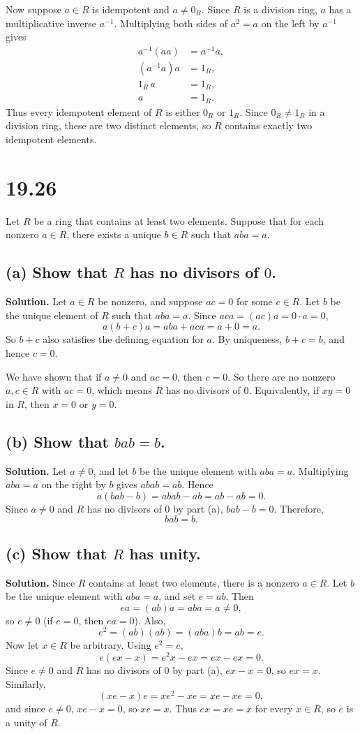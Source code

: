\documentclass[11pt]{article}
\begin{document}
Now suppose \(a\in R\) is idempotent and \(a\neq0_R\). Since \(R\) is a
division ring, \(a\) has a multiplicative inverse \(a^{-1}\).
Multiplying both sides of \(a^2=a\) on the left by \(a^{-1}\) gives
\[
\begin{aligned}
a^{-1}(aa)&=a^{-1}a,\\
(a^{-1}a)a&=1_R,\\
1_R\,a&=1_R,\\
a&=1_R.
\end{aligned}
\]
Thus every idempotent element of \(R\) is either \(0_R\) or \(1_R\).
Since \(0_R\neq1_R\) in a division ring, these are two distinct elements,
so \(R\) contains exactly two idempotent elements.

\section*{19.26}
Let \(R\) be a ring that contains at least two elements. Suppose that
for each nonzero \(a\in R\), there exists a unique \(b\in R\) such that
\(aba=a\).

\subsection*{(a) Show that \(R\) has no divisors of \(0\).}
\noindent\textbf{Solution.}
Let \(a\in R\) be nonzero, and suppose \(ac=0\) for some \(c\in R\).
Let \(b\) be the unique element of \(R\) such that \(aba=a\).
Since \(aca=(ac)a=0\cdot a=0\),
\[
a(b+c)a=aba+aca=a+0=a.
\]
So \(b+c\) also satisfies the defining equation for \(a\).
By uniqueness, \(b+c=b\), and hence \(c=0\).

We have shown that if \(a\neq0\) and \(ac=0\), then \(c=0\). So there
are no nonzero \(a,c\in R\) with \(ac=0\), which means \(R\) has no
divisors of \(0\). Equivalently, if \(xy=0\) in \(R\), then \(x=0\) or
\(y=0\).

\subsection*{(b) Show that \(bab=b\).}
\noindent\textbf{Solution.}
Let \(a\neq0\), and let \(b\) be the unique element with \(aba=a\).
Multiplying \(aba=a\) on the right by \(b\) gives \(abab=ab\).
Hence
\[
a(bab-b)=abab-ab=ab-ab=0.
\]
Since \(a\neq0\) and \(R\) has no divisors of \(0\) by part (a),
\(bab-b=0\). Therefore,
\[
\boxed{bab=b.}
\]

\subsection*{(c) Show that \(R\) has unity.}
\noindent\textbf{Solution.}
Since \(R\) contains at least two elements, there is a nonzero
\(a\in R\). Let \(b\) be the unique element with \(aba=a\), and set
\(e=ab\). Then
\[
ea=(ab)a=aba=a\neq0,
\]
so \(e\neq0\) (if \(e=0\), then \(ea=0\)). Also,
\[
e^2=(ab)(ab)=(aba)b=ab=e.
\]
Now let \(x\in R\) be arbitrary. Using \(e^2=e\),
\[
e(ex-x)=e^2x-ex=ex-ex=0.
\]
Since \(e\neq0\) and \(R\) has no divisors of \(0\) by part (a),
\(ex-x=0\), so \(ex=x\). Similarly,
\[
(xe-x)e=xe^2-xe=xe-xe=0,
\]
and since \(e\neq0\), \(xe-x=0\), so \(xe=x\).
Thus \(ex=xe=x\) for every \(x\in R\), so \(e\) is a unity of \(R\).
\end{document}
